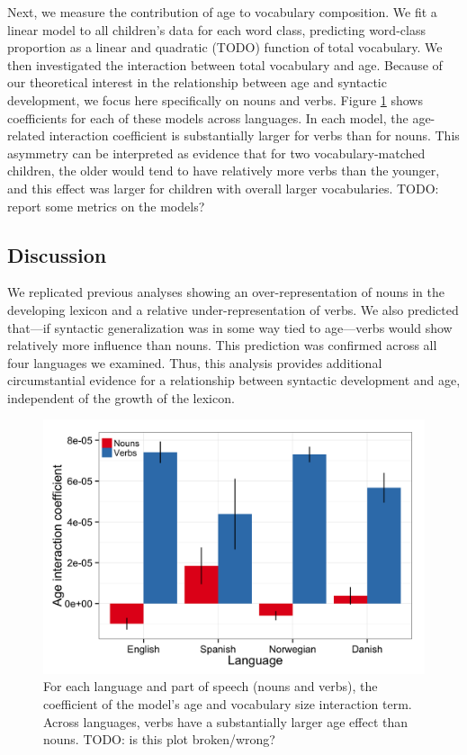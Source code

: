 \documentclass[10pt,letterpaper]{article}
\begin{document}
Next, we measure the contribution of age to vocabulary composition. We fit a linear model to all children's data for each word class, predicting word-class proportion as a linear and quadratic (TODO) function of total vocabulary. We then investigated the interaction between total vocabulary and age. Because of our theoretical interest in the relationship between age and syntactic development, we focus here specifically on nouns and verbs. Figure \ref{fig:coefs_noun_verb} shows coefficients for each of these models across languages. In each model, the age-related interaction coefficient is substantially larger for verbs than for nouns. This asymmetry can be interpreted as evidence that for two vocabulary-matched children, the older would tend to have relatively more verbs than the younger, and this effect was larger for children with overall larger vocabularies. TODO: report some metrics on the models?

\subsection{Discussion}

We replicated previous analyses showing an over-representation of nouns in the developing lexicon and a relative under-representation of verbs. We also predicted that---if syntactic generalization was in some way tied to age---verbs would show relatively more influence than nouns. This prediction was confirmed across all four languages we examined. Thus, this analysis provides additional circumstantial evidence for a relationship between syntactic development and age, independent of the growth of the lexicon.

\begin{figure}[!tb]
\centering
\includegraphics[width=\linewidth]{plots/coefs_noun_verb.png}
\caption{\label{fig:coefs_noun_verb} For each language and part of speech (nouns and verbs), the coefficient of the model's age and vocabulary size interaction term. Across languages, verbs have a substantially larger age effect than nouns. TODO: is this plot broken/wrong?}
\end{figure}
\end{document}
